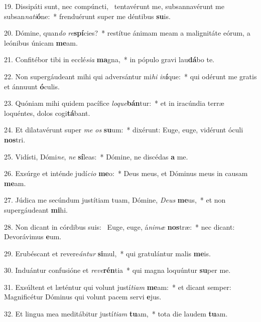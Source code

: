 19. Dissipáti sunt, nec compúncti, \dag\  tentavérunt me, subsannavérunt me subsan\textit{na}\textit{ti}\textbf{ó}ne:~*  frenduérunt super me déntibus \textbf{su}is.\

20. Dómine, quan\textit{do} \textit{re}\textbf{spí}cies?~*  restítue ánimam meam a malignitáte eórum, a leónibus únicam \textbf{me}am.\

21. Confitébor tibi in ecclé\textit{si}\textit{a} \textbf{ma}gna,~*  in pópulo gravi lau\textbf{dá}bo te.\

22. Non supergáudeant mihi qui adversántur mi\textit{hi} \textit{in}\textbf{í}que:~*  qui odérunt me gratis et ánnuunt \textbf{ó}culis.\

23. Quóniam mihi quidem pacífice \textit{lo}\textit{que}\textbf{bán}tur:~*  et in iracúndia terræ loquéntes, dolos cogi\textbf{tá}bant.\

24. Et dilatavérunt super \textit{me} \textit{os} \textbf{su}um:~*  dixérunt: Euge, euge, vidérunt óculi \textbf{nos}tri.\

25. Vidísti, Dómi\textit{ne}, \textit{ne} \textbf{sí}leas:~*  Dómine, ne discédas \textbf{a} me.\

26. Exsúrge et inténde judí\textit{ci}\textit{o} \textbf{me}o:~*  Deus meus, et Dóminus meus in causam \textbf{me}am.\

27. Júdica me secúndum justítiam tuam, Dómine, \textit{De}\textit{us} \textbf{me}us,~*  et non supergáudeant \textbf{mi}hi.\

28. Non dicant in córdibus suis: \dag\  Euge, euge, á\textit{ni}\textit{mæ} \textbf{nos}træ:~*  nec dicant: Devorávimus \textbf{e}um.\

29. Erubéscant et revere\textit{án}\textit{tur} \textbf{si}mul,~*  qui gratulántur malis \textbf{me}is.\

30. Induántur confusióne et \textit{re}\textit{ve}\textbf{rén}tia~*  qui magna loquúntur \textbf{su}per me.\

31. Exsúltent et læténtur qui volunt justí\textit{ti}\textit{am} \textbf{me}am:~*  et dicant semper: Magnificétur Dóminus qui volunt pacem servi \textbf{e}jus.\

32. Et lingua mea meditábitur justí\textit{ti}\textit{am} \textbf{tu}am,~*  tota die laudem \textbf{tu}am.\

